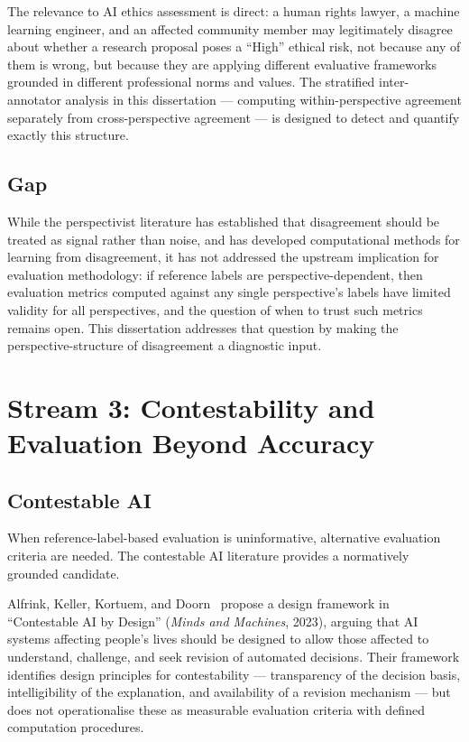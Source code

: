 The relevance to AI ethics assessment is direct: a human rights lawyer, a
machine learning engineer, and an affected community member may legitimately
disagree about whether a research proposal poses a ``High'' ethical risk, not
because any of them is wrong, but because they are applying different
evaluative frameworks grounded in different professional norms and values.
The stratified inter-annotator analysis in this dissertation --- computing
within-perspective agreement separately from cross-perspective agreement ---
is designed to detect and quantify exactly this structure.

\subsection{Gap}

While the perspectivist literature has established that disagreement should be
treated as signal rather than noise, and has developed computational methods
for learning from disagreement, it has not addressed the upstream implication
for evaluation methodology: if reference labels are perspective-dependent,
then evaluation metrics computed against any single perspective's labels have
limited validity for all perspectives, and the question of when to trust such
metrics remains open.  This dissertation addresses that question by making
the perspective-structure of disagreement a diagnostic input.

\section{Stream 3: Contestability and Evaluation Beyond Accuracy}

\subsection{Contestable AI}

When reference-label-based evaluation is uninformative, alternative evaluation
criteria are needed.  The contestable AI literature provides a normatively
grounded candidate.

Alfrink, Keller, Kortuem, and Doorn~\cite{alfrink2023contestable} propose a
design framework in ``Contestable AI by Design'' (\emph{Minds and Machines},
2023), arguing that AI systems affecting people's lives should be designed to
allow those affected to understand, challenge, and seek revision of automated
decisions.  Their framework identifies design principles for contestability
--- transparency of the decision basis, intelligibility of the explanation,
and availability of a revision mechanism --- but does not operationalise these
as measurable evaluation criteria with defined computation procedures.

